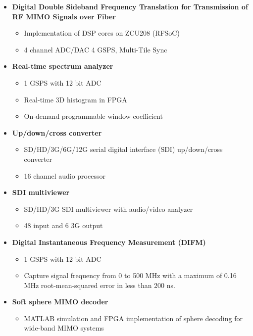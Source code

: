 
\begin{itemize}
	\item \textbf{Digital Double Sideband Frequency Translation for	Transmission of RF MIMO Signals over Fiber}
	      \begin{itemize}
		      \item Implementation of DSP cores on ZCU208 (RFSoC)
		      \item 4 channel ADC/DAC 4 GSPS, Multi-Tile Sync 
	      \end{itemize}
	\item \textbf{Real-time spectrum analyzer}
	      \begin{itemize}
		      \item 1 GSPS with 12 bit ADC
		      \item Real-time 3D histogram in FPGA
		      \item On-demand programmable window coefficient
	      \end{itemize}
	\item \textbf{Up/down/cross converter}
	      \begin{itemize}
		      \item SD/HD/3G/6G/12G serial digital interface (SDI) up/down/cross converter
		      \item 16 channel audio processor
	      \end{itemize}
	\item \textbf{SDI multiviewer}
	      \begin{itemize}
		      \item SD/HD/3G SDI multiviewer with audio/video analyzer 
		      \item 48 input and 6 3G output
	      \end{itemize}
	\item \textbf{Digital Instantaneous Frequency Measurement (DIFM)}
	      \begin{itemize}
		      \item 1 GSPS with 12 bit ADC
		      \item Capture signal frequency from 0 to 500 MHz with a maximum of 0.16 MHz root-mean-squared error in less than 200 ns.
	      \end{itemize}
	\item \textbf{Soft sphere MIMO decoder}
	      \begin{itemize}
		      \item MATLAB simulation and FPGA implementation of sphere decoding for wide-band MIMO systems

\end{itemize}
\end{itemize}
